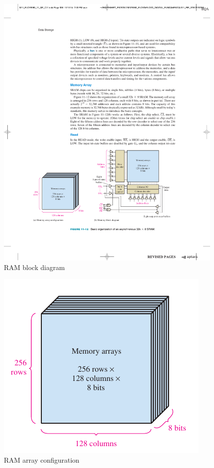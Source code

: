 \begin{figure}[H]
    \centering
    \includegraphics[scale = 0.85]{Graphics/Practice 6/RAM/RAM_BLOCK_DIAG.pdf}
    \caption{RAM block diagram ~\autocite{FLOYD}}
    \label{fig:RAM_BLOCK_DIAG}
\end{figure}


\begin{figure}[H]
    \centering
    \includegraphics[scale = 0.85]{Graphics/Practice 6/RAM/RAM_BLOCK_CONFIG.pdf}
    \caption{RAM array configuration ~\autocite{FLOYD}}
    \label{fig:RAM_BLOCK_CONFIG}
\end{figure}


